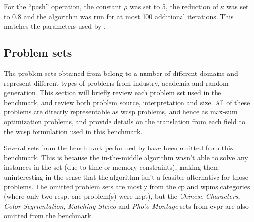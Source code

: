 For the \enquote{push} operation, the constant \(\rho\) was set to \num{5}, the reduction of \(\kappa\) was set to \num{0.8} and the algorithm was run for at most \num{100} additional iterations.
This matches the parameters used by \textcite{Bastert10}.

\subsection{Problem sets}
The problem sets obtained from \textcite{deGivry14} belong to a number of different domains and represent different types of problems from industry, academia and random generation.
This section will briefly review each problem set used in the benchmark, and review both problem source, interpretation and size.
All of these problems are directly representable as \gls{wcsp} problems, and hence as max-sum optimization problems, and \textcite{deGivry14} provide details on the translation from each field to the \gls{wcsp} formulation used in this benchmark.

Several sets from the benchmark performed by \textcite{deGivry14} have been omitted from this benchmark.
This is because the in-the-middle algorithm wasn't able to solve any instances in the set (due to time or memory constraints), making them uninteresting in the sense that the algorithm isn't a feasible alternative for those problems. 
The omitted problem sets are mostly from the \gls{cp} and \gls{wpms} categories (where only two resp. one problem(s) were kept), but the \emph{Chinese Characters}, \emph{Color Segmentation}, \emph{Matching Stereo} and \emph{Photo Montage} sets from \gls{cvpr} are also omitted from the benchmark.


